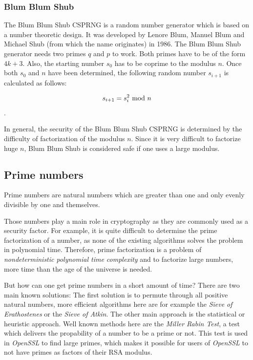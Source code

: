 \subsubsection{Blum Blum Shub}

The Blum Blum Shub CSPRNG is a random number generator which is based on a number
theoretic design. It was developed by Lenore Blum, Manuel Blum and Michael Shub
(from which the name originates) in 1986. The Blum Blum Shub generator needs
two primes $q$ and $p$ to work. Both primes have to be of the form $4k + 3$. Also,
the starting number $s_0$ has to be coprime to the modulus $n$.
Once both $s_0$ and $n$ have been determined, the following random number $s_{i+1}$ is
calculated as follows:

$$s_{i+1} = s_{i}^2 \ \text{mod}\ n$$.

In general, the security of the Blum Blum Shub CSPRNG is determined by the
difficulty of factorization of the modulus $n$. Since it is very difficult
to factorize huge $n$, Blum Blum Shub is considered safe if one uses a large
modulus.

\subsection{Prime numbers}

Prime numbers are natural numbers which are greater than one and only evenly
divisible by one and themselves.

Those numbers play a main role in cryptography as they are commonly used
as a security factor. For example, it is quite difficult to determine the
prime factorization of a number, as none of the existing algorithms solves
the problem in polynomial time. Therefore, prime factorization is a problem
of \textit{nondeterministic polynomial time complexity} and to factorize
large numbers, more time than the age of the universe is needed.

But how can one get prime numbers in a short amount of time? There are two
main known solutions: The first solution is to permute through all positive
natural numbers, more efficient algorithms here are for example the
\textit{Sieve of Erathostenes} or the \textit{Sieve of Atkin}. The other
main approach is the statistical or heuristic approach. Well known methods
here are the \textit{Miller Rabin Test}, a test which delivers the propability
of a number to be a prime or not. This test is used in \textit{OpenSSL} to
find large primes, which makes it possible for users of \textit{OpenSSL} to
not have primes as factors of their RSA modulus.

